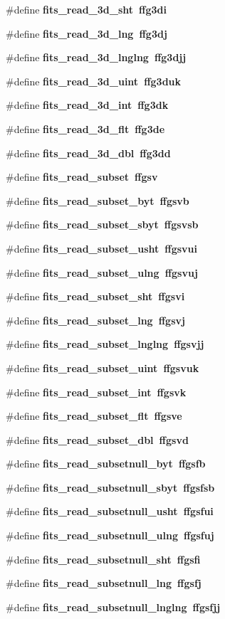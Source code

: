 \begin{CompactItemize}
\item 
\#define \bf{fits\_\-read\_\-3d\_\-sht}~ffg3di
\item 
\#define \bf{fits\_\-read\_\-3d\_\-lng}~ffg3dj
\item 
\#define \bf{fits\_\-read\_\-3d\_\-lnglng}~ffg3djj
\item 
\#define \bf{fits\_\-read\_\-3d\_\-uint}~ffg3duk
\item 
\#define \bf{fits\_\-read\_\-3d\_\-int}~ffg3dk
\item 
\#define \bf{fits\_\-read\_\-3d\_\-flt}~ffg3de
\item 
\#define \bf{fits\_\-read\_\-3d\_\-dbl}~ffg3dd
\item 
\#define \bf{fits\_\-read\_\-subset}~ffgsv
\item 
\#define \bf{fits\_\-read\_\-subset\_\-byt}~ffgsvb
\item 
\#define \bf{fits\_\-read\_\-subset\_\-sbyt}~ffgsvsb
\item 
\#define \bf{fits\_\-read\_\-subset\_\-usht}~ffgsvui
\item 
\#define \bf{fits\_\-read\_\-subset\_\-ulng}~ffgsvuj
\item 
\#define \bf{fits\_\-read\_\-subset\_\-sht}~ffgsvi
\item 
\#define \bf{fits\_\-read\_\-subset\_\-lng}~ffgsvj
\item 
\#define \bf{fits\_\-read\_\-subset\_\-lnglng}~ffgsvjj
\item 
\#define \bf{fits\_\-read\_\-subset\_\-uint}~ffgsvuk
\item 
\#define \bf{fits\_\-read\_\-subset\_\-int}~ffgsvk
\item 
\#define \bf{fits\_\-read\_\-subset\_\-flt}~ffgsve
\item 
\#define \bf{fits\_\-read\_\-subset\_\-dbl}~ffgsvd
\item 
\#define \bf{fits\_\-read\_\-subsetnull\_\-byt}~ffgsfb
\item 
\#define \bf{fits\_\-read\_\-subsetnull\_\-sbyt}~ffgsfsb
\item 
\#define \bf{fits\_\-read\_\-subsetnull\_\-usht}~ffgsfui
\item 
\#define \bf{fits\_\-read\_\-subsetnull\_\-ulng}~ffgsfuj
\item 
\#define \bf{fits\_\-read\_\-subsetnull\_\-sht}~ffgsfi
\item 
\#define \bf{fits\_\-read\_\-subsetnull\_\-lng}~ffgsfj
\item 
\#define \bf{fits\_\-read\_\-subsetnull\_\-lnglng}~ffgsfjj
\item 

\end{CompactItemize}
